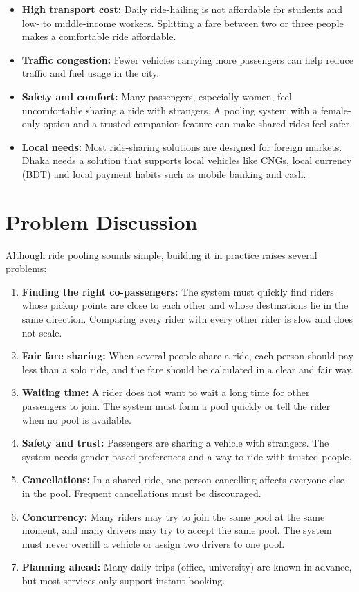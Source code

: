 \begin{itemize}
  \item \textbf{High transport cost:} Daily ride-hailing is not affordable for
        students and low- to middle-income workers. Splitting a fare between
        two or three people makes a comfortable ride affordable.
  \item \textbf{Traffic congestion:} Fewer vehicles carrying more passengers
        can help reduce traffic and fuel usage in the city.
  \item \textbf{Safety and comfort:} Many passengers, especially women, feel
        uncomfortable sharing a ride with strangers. A pooling system with a
        female-only option and a trusted-companion feature can make shared
        rides feel safer.
  \item \textbf{Local needs:} Most ride-sharing solutions are designed for
        foreign markets. Dhaka needs a solution that supports local vehicles
        like CNGs, local currency (BDT) and local payment habits such as mobile
        banking and cash.
\end{itemize}

\section{Problem Discussion}
\label{sec:problem}

Although ride pooling sounds simple, building it in practice raises several
problems:

\begin{enumerate}
  \item \textbf{Finding the right co-passengers:} The system must quickly find
        riders whose pickup points are close to each other and whose
        destinations lie in the same direction. Comparing every rider with
        every other rider is slow and does not scale.
  \item \textbf{Fair fare sharing:} When several people share a ride, each
        person should pay less than a solo ride, and the fare should be
        calculated in a clear and fair way.
  \item \textbf{Waiting time:} A rider does not want to wait a long time for
        other passengers to join. The system must form a pool quickly or tell
        the rider when no pool is available.
  \item \textbf{Safety and trust:} Passengers are sharing a vehicle with
        strangers. The system needs gender-based preferences and a way to ride
        with trusted people.
  \item \textbf{Cancellations:} In a shared ride, one person cancelling affects
        everyone else in the pool. Frequent cancellations must be discouraged.
  \item \textbf{Concurrency:} Many riders may try to join the same pool at the
        same moment, and many drivers may try to accept the same pool. The
        system must never overfill a vehicle or assign two drivers to one pool.
  \item \textbf{Planning ahead:} Many daily trips (office, university) are
        known in advance, but most services only support instant booking.
\end{enumerate}

